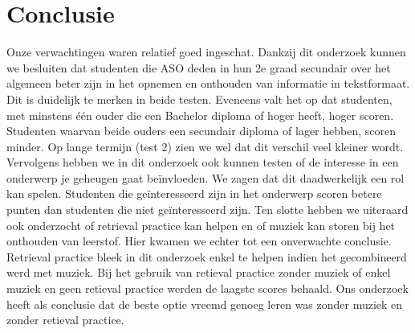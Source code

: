 \documentclass{hogent-article}
\begin{document}
	\section{Conclusie}
	Onze verwachtingen waren relatief goed ingeschat. Dankzij dit onderzoek kunnen we besluiten dat studenten die ASO deden in hun 2e graad secundair over het algemeen beter zijn in het opnemen en onthouden van informatie in tekstformaat. Dit is duidelijk te merken in beide testen. Eveneens valt het op dat studenten, met minstens één ouder die een Bachelor diploma of hoger heeft, hoger scoren. Studenten waarvan beide ouders een secundair diploma of lager hebben, scoren minder. Op lange termijn (test 2) zien we wel dat dit verschil veel kleiner wordt. Vervolgens hebben we in dit onderzoek ook kunnen testen of de interesse in een onderwerp je geheugen gaat beïnvloeden. We zagen dat dit daadwerkelijk een rol kan spelen. Studenten die geïnteresseerd zijn in het onderwerp scoren betere punten dan studenten die niet geïnteresseerd zijn. Ten slotte hebben we uiteraard ook onderzocht of retrieval practice kan helpen en of muziek kan storen bij het onthouden van leerstof. Hier kwamen we echter tot een onverwachte conclusie. Retrieval practice bleek in dit onderzoek enkel te helpen indien het gecombineerd werd met muziek. Bij het gebruik van retieval practice zonder muziek of enkel muziek en geen retieval practice werden de laagste scores behaald. Ons onderzoek heeft als conclusie dat de beste optie vreemd genoeg leren was zonder muziek en zonder retieval practice.
	
	
	
	\printbibliography[heading=bibintoc]
	
\end{document}
